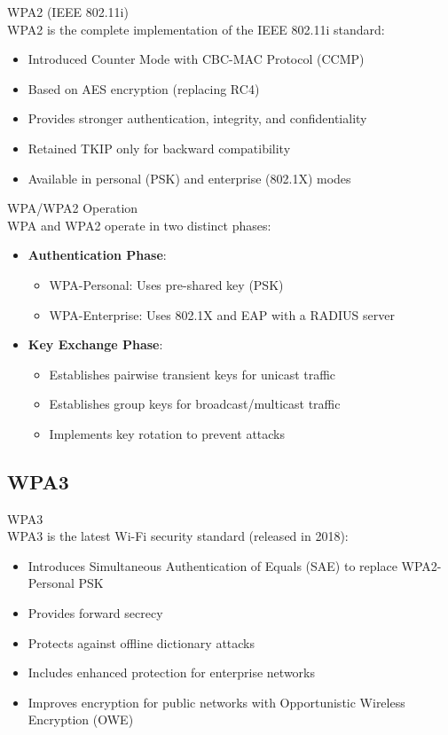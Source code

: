 \begin{definition}{WPA2 (IEEE 802.11i)}\\
WPA2 is the complete implementation of the IEEE 802.11i standard:
\begin{itemize}
    \item Introduced Counter Mode with CBC-MAC Protocol (CCMP)
    \item Based on AES encryption (replacing RC4)
    \item Provides stronger authentication, integrity, and confidentiality
    \item Retained TKIP only for backward compatibility
    \item Available in personal (PSK) and enterprise (802.1X) modes
\end{itemize}
\end{definition}

\begin{concept}{WPA/WPA2 Operation}\\
WPA and WPA2 operate in two distinct phases:
\begin{itemize}
    \item \textbf{Authentication Phase}:
    \begin{itemize}
        \item WPA-Personal: Uses pre-shared key (PSK)
        \item WPA-Enterprise: Uses 802.1X and EAP with a RADIUS server
    \end{itemize}
    \item \textbf{Key Exchange Phase}:
    \begin{itemize}
        \item Establishes pairwise transient keys for unicast traffic
        \item Establishes group keys for broadcast/multicast traffic
        \item Implements key rotation to prevent attacks
    \end{itemize}
\end{itemize}
\end{concept}

\subsection{WPA3}

\begin{definition}{WPA3}\\
WPA3 is the latest Wi-Fi security standard (released in 2018):
\begin{itemize}
    \item Introduces Simultaneous Authentication of Equals (SAE) to replace WPA2-Personal PSK
    \item Provides forward secrecy
    \item Protects against offline dictionary attacks
    \item Includes enhanced protection for enterprise networks
    \item Improves encryption for public networks with Opportunistic Wireless Encryption (OWE)
\end{itemize}
\end{definition}


